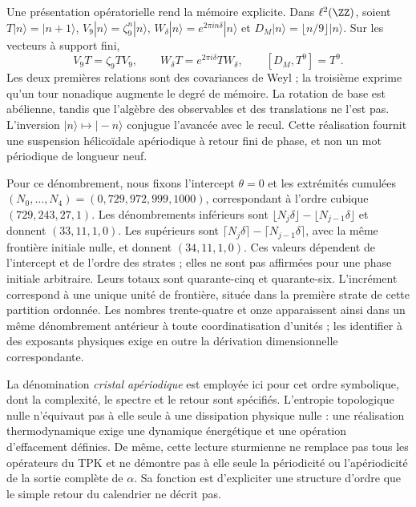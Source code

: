 Une présentation opératorielle rend la mémoire explicite. Dans \(\ell^2(\ZZ)\), soient \(T|n\rangle=|n+1\rangle\), \(V_9|n\rangle=\zeta_9^n|n\rangle\), \(W_\delta|n\rangle=e^{2\pi i n\delta}|n\rangle\) et \(D_M|n\rangle=\lfloor n/9\rfloor|n\rangle\). Sur les vecteurs à support fini,
\begin{equation}
 V_9T=\zeta_9TV_9,\qquad
 W_\delta T=e^{2\pi i\delta}TW_\delta,\qquad
 [D_M,T^9]=T^9.
 \label{eq:weyl-relojes}
\end{equation}
Les deux premières relations sont des covariances de Weyl ; la troisième exprime qu'un tour nonadique augmente le degré de mémoire. La rotation de base est abélienne, tandis que l'algèbre des observables et des translations ne l'est pas. L'inversion \(|n\rangle\mapsto|-n\rangle\) conjugue l'avancée avec le recul. Cette réalisation fournit une suspension hélicoïdale apériodique à retour fini de phase, et non un mot périodique de longueur neuf.



Pour ce dénombrement, nous fixons l'intercept \(\theta=0\) et les extrémités cumulées \((N_0,\ldots,N_4)=(0,729,972,999,1000)\), correspondant à l'ordre cubique \((729,243,27,1)\). Les dénombrements inférieurs sont \(\lfloor N_j\delta\rfloor-\lfloor N_{j-1}\delta\rfloor\) et donnent \((33,11,1,0)\). Les supérieurs sont \(\lceil N_j\delta\rceil-\lceil N_{j-1}\delta\rceil\), avec la même frontière initiale nulle, et donnent \((34,11,1,0)\). Ces valeurs dépendent de l'intercept et de l'ordre des strates ; elles ne sont pas affirmées pour une phase initiale arbitraire. Leurs totaux sont quarante-cinq et quarante-six. L'incrément correspond à une unique unité de frontière, située dans la première strate de cette partition ordonnée. Les nombres trente-quatre et onze apparaissent ainsi dans un même dénombrement antérieur à toute coordinatisation d'unités ; les identifier à des exposants physiques exige en outre la dérivation dimensionnelle correspondante.

La dénomination \emph{cristal apériodique} est employée ici pour cet ordre symbolique, dont la complexité, le spectre et le retour sont spécifiés. L'entropie topologique nulle n'équivaut pas à elle seule à une dissipation physique nulle : une réalisation thermodynamique exige une dynamique énergétique et une opération d'effacement définies. De même, cette lecture sturmienne ne remplace pas tous les opérateurs du TPK et ne démontre pas à elle seule la périodicité ou l'apériodicité de la sortie complète de \(\alpha\). Sa fonction est d'expliciter une structure d'ordre que le simple retour du calendrier ne décrit pas.




